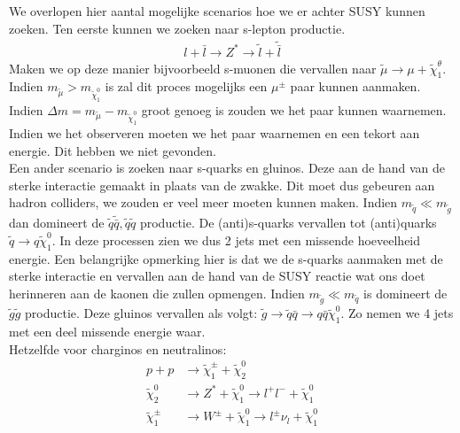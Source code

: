 \documentclass[../main.tex]{subfiles}
\begin{document}
We overlopen hier aantal mogelijke scenarios hoe we er achter SUSY kunnen zoeken. Ten eerste kunnen we zoeken naar s-lepton productie.
\begin{equation}
    \begin{aligned}
        \label{eq:slepton_productie}
        l+\bar{l} \rightarrow Z^{*} \rightarrow \tilde{l}+\tilde{\bar{l}}
    \end{aligned}
\end{equation}
Maken we op deze manier bijvoorbeeld s-muonen die vervallen naar $\tilde{\mu} \rightarrow \mu+\tilde{\chi}_{1}^{\theta}$. Indien $m_{\tilde{\mu}}>m_{\tilde{\chi}_{1}^{0}}$ is zal dit proces mogelijks een $\mu^\pm$ paar kunnen aanmaken. Indien $\Delta m=m_{\tilde{\mu}}-m_{\tilde{\chi}_{1}^{0}}$ groot genoeg is zouden we het paar kunnen waarnemen. Indien we het observeren moeten we het paar waarnemen en een tekort aan energie. Dit hebben we niet gevonden.\\
Een ander scenario is zoeken naar s-quarks en gluinos. Deze aan de hand van de sterke interactie gemaakt in plaats van de zwakke. Dit moet dus gebeuren aan hadron colliders, we zouden er veel meer moeten kunnen maken. Indien $m_{\tilde{q}} \ll m_{\tilde{g}}$ dan domineert de $\tilde{q} \tilde{\bar{q}}, \tilde{q} \tilde{q}$ productie. De (anti)s-quarks vervallen tot (anti)quarks $\tilde{q} \rightarrow q \tilde{\chi}_{1}^{0}$. In deze processen zien we dus 2 jets met een missende hoeveelheid energie. Een belangrijke opmerking hier is dat we de s-quarks aanmaken met de sterke interactie en vervallen aan de hand van de SUSY reactie wat ons doet herinneren aan de kaonen die zullen opmengen. Indien $m_{\tilde{g}} \ll m_{\tilde{q}}$ is domineert de $\tilde{g} \tilde{g}$ productie. Deze gluinos vervallen als volgt: $\tilde{g} \rightarrow \tilde{q} \bar{q} \rightarrow q \bar{q} \tilde{\chi}_{1}^{0}$. Zo nemen we 4 jets met een deel missende energie waar.\\
Hetzelfde voor charginos en neutralinos:
\begin{equation}
    \begin{aligned}
        \label{eq:char_neutr_prod}
        p+p & \rightarrow \tilde{\chi}_{1}^{\pm}+\tilde{\chi}_{2}^{0} \\
        \tilde{\chi}_{2}^{0} & \rightarrow Z^{*}+\tilde{\chi}_{1}^{0} \rightarrow l^{+} l^{-}+\tilde{\chi}_{1}^{0} \\
        \tilde{\chi}_{1}^{\pm} & \rightarrow W^{\pm}+\tilde{\chi}_{1}^{0} \rightarrow l^{\pm} \nu_{l}+\tilde{\chi}_{1}^{0}
    \end{aligned}
\end{equation}
\end{document}
